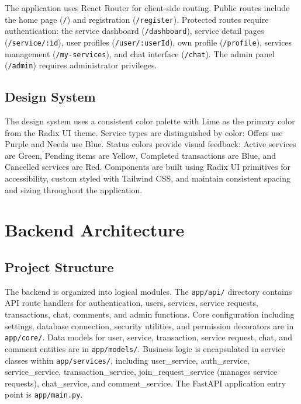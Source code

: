 \documentclass[12pt,a4paper]{report}
\begin{document}
The application uses React Router for client-side routing. Public routes include the home page (\texttt{/}) and registration (\texttt{/register}). Protected routes require authentication: the service dashboard (\texttt{/dashboard}), service detail pages (\texttt{/service/:id}), user profiles (\texttt{/user/:userId}), own profile (\texttt{/profile}), services management (\texttt{/my-services}), and chat interface (\texttt{/chat}). The admin panel (\texttt{/admin}) requires administrator privileges.

\subsection{Design System}

The design system uses a consistent color palette with Lime as the primary color from the Radix UI theme. Service types are distinguished by color: Offers use Purple and Needs use Blue. Status colors provide visual feedback: Active services are Green, Pending items are Yellow, Completed transactions are Blue, and Cancelled services are Red. Components are built using Radix UI primitives for accessibility, custom styled with Tailwind CSS, and maintain consistent spacing and sizing throughout the application.

\section{Backend Architecture}

\subsection{Project Structure}

The backend is organized into logical modules. The \texttt{app/api/} directory contains API route handlers for authentication, users, services, service requests, transactions, chat, comments, and admin functions. Core configuration including settings, database connection, security utilities, and permission decorators are in \texttt{app/core/}. Data models for user, service, transaction, service request, chat, and comment entities are in \texttt{app/models/}. Business logic is encapsulated in service classes within \texttt{app/services/}, including user\_service, auth\_service, service\_service, transaction\_service, join\_request\_service (manages service requests), chat\_service, and comment\_service. The FastAPI application entry point is \texttt{app/main.py}.
\end{document}
